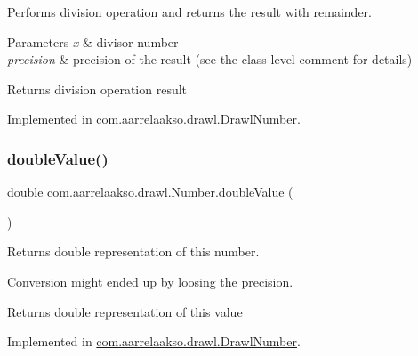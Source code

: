 Performs division operation and returns the result with remainder. 


\begin{DoxyParams}{Parameters}
{\em x} & divisor number \\
\hline
{\em precision} & precision of the result (see the class level comment for details) \\
\hline
\end{DoxyParams}
\begin{DoxyReturn}{Returns}
division operation result 
\end{DoxyReturn}


Implemented in \hyperlink{classcom_1_1aarrelaakso_1_1drawl_1_1_drawl_number_a6dc7cefb2574b9675ab3bc099760cbd2}{com.\+aarrelaakso.\+drawl.\+Drawl\+Number}.

\mbox{\label{interfacecom_1_1aarrelaakso_1_1drawl_1_1_number_ad409a636270d5fcc2591791a4e862179}} 
\subsubsection{\texorpdfstring{double\+Value()}{doubleValue()}}
{\footnotesize\ttfamily double com.\+aarrelaakso.\+drawl.\+Number.\+double\+Value (\begin{DoxyParamCaption}{ }\end{DoxyParamCaption})}



Returns double representation of this number. 

Conversion might ended up by loosing the precision.

\begin{DoxyReturn}{Returns}
double representation of this value 
\end{DoxyReturn}


Implemented in \hyperlink{classcom_1_1aarrelaakso_1_1drawl_1_1_drawl_number_af5e6d77e51e7b6167d18acec2eb26877}{com.\+aarrelaakso.\+drawl.\+Drawl\+Number}.

\mbox{\label{interfacecom_1_1aarrelaakso_1_1drawl_1_1_number_afe7ed1040e76bfb7a01c1e3835218827}} 
